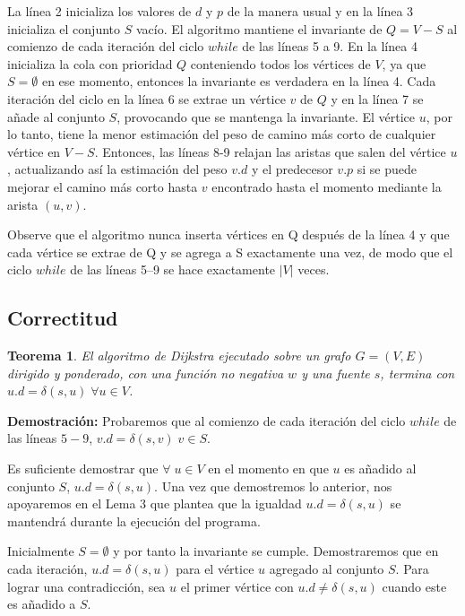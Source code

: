 \documentclass[12pt]{article}
\newcommand{\proof}{\textbf{Demostración:} }
\newcommand{\nl}{\vspace{0.3cm}}
\newtheorem{theorem}{Teorema}
\begin{document}
La línea 2 inicializa los valores de $d$ y $p$ de la manera usual y en la línea 3 inicializa el conjunto $S$ vacío. El algoritmo mantiene el invariante de $Q = V - S$ al comienzo de cada iteración del ciclo $while$ de las líneas 5 a 9. En la línea 4 inicializa la cola con prioridad $Q$ conteniendo todos los vértices de $V$, ya que $S = \emptyset$ en ese momento, entonces la invariante es verdadera en la línea 4. Cada iteración del ciclo en la línea 6 se extrae un vértice $v$ de $Q$ y en la línea 7 se añade al conjunto $S$, provocando que se mantenga la invariante. El vértice $u$, por lo tanto, tiene la menor estimación del peso de camino más corto de cualquier vértice en $V - S$. Entonces, las líneas 8-9 relajan las aristas que salen del vértice $u$, actualizando así la estimación del peso $v.d$ y el predecesor $v.p$ si se puede mejorar el camino más corto hasta $v$ encontrado hasta el momento mediante la arista $(u, v)$.

\nl

Observe que el algoritmo nunca inserta vértices en Q después de la línea 4 y que cada vértice se extrae de Q y se agrega a S exactamente una vez, de modo que el ciclo $while$ de las líneas 5–9 se hace exactamente $|V|$ veces.

\subsection{Correctitud}

\begin{theorem}
	El algoritmo de Dijkstra ejecutado sobre un grafo $G = (V,E) $ dirigido y ponderado, con una función no negativa $w$ y una fuente $s$, termina con $u.d = \delta(s, u) \; \forall u \in V$.
\end{theorem}

\proof Probaremos que al comienzo de cada iteración del ciclo $while$ de las líneas $5-9$, $v.d = \delta(s, v) \; v \in S$.

\nl

Es suficiente demostrar que $\forall \; u \in V$ en el momento en que $u$ es añadido al conjunto $S$, $u.d = \delta(s, u)$. Una vez que demostremos lo anterior, nos apoyaremos en el Lema 3 que plantea que la igualdad $u.d = \delta(s, u)$ se mantendrá durante la ejecución del programa.

\nl

Inicialmente $S = \emptyset$ y por tanto la invariante se cumple. Demostraremos que en cada iteración, $u.d = \delta(s,u)$ para el vértice $u$ agregado al conjunto $S$. Para lograr una contradicción, sea $u$ el primer vértice con $u.d \neq \delta(s,u)$ cuando este es añadido a $S$.
\end{document}

